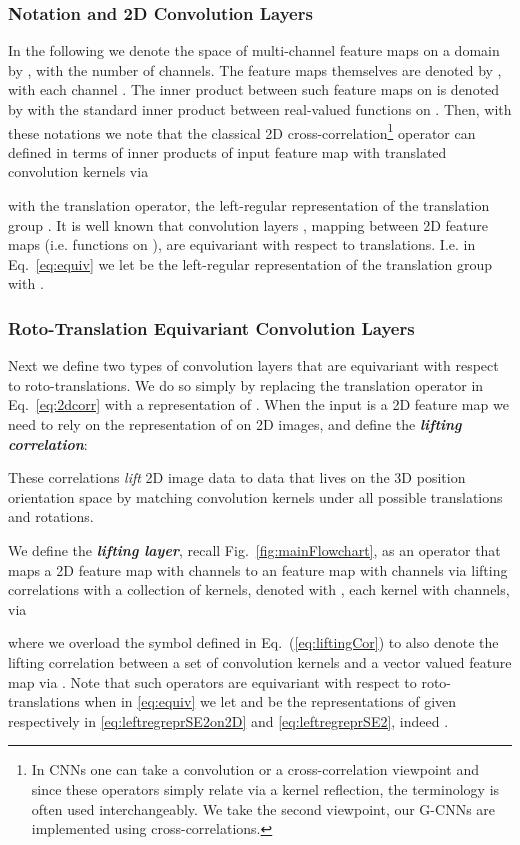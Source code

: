 \documentclass[twocolumn,final]{article}
\begin{document}
\subsubsection{Notation and 2D Convolution Layers}
In the following we denote the space of multi-channel feature maps on a domain  by , with  the number of channels. The feature maps themselves are denoted by , with each channel . The inner product between such feature maps on  is denoted by 
 with  the standard inner product between real-valued functions on .
Then, with these notations we note that the classical 2D cross-correlation\footnote{In CNNs one can take a convolution or a cross-correlation viewpoint and since these operators simply relate via a kernel reflection, the terminology is often used interchangeably. We take the second viewpoint, our G-CNNs are implemented using cross-correlations.} operator can defined in terms of inner products of input feature map  with translated convolution kernels  via

with  the translation operator, the left-regular representation of the translation group . It is well known that convolution layers , mapping between 2D feature maps (i.e. functions on ), are equivariant with respect to translations. I.e. in Eq.~\eqref{eq:equiv} we let  be the left-regular representation of the translation group with .

\subsubsection{Roto-Translation Equivariant Convolution Layers}
Next we define two types of convolution layers that are equivariant with respect to roto-translations. We do so simply by replacing the translation operator in Eq.~\eqref{eq:2dcorr} with a representation of . When the input is a 2D feature map  we need to rely on the representation  of  on 2D images, and define the \textbf{\emph{lifting correlation}}:

These correlations \emph{lift} 2D image data to data that lives on the 3D position orientation space  by matching convolution kernels under all possible translations and rotations. 

We define the \textbf{\emph{lifting layer}}, recall Fig.~\ref{fig:mainFlowchart}, as an operator {} that maps a 2D feature map  with  channels to an  feature map  with  channels via lifting correlations with a collection of  kernels, denoted with , each kernel with  channels, via

where we overload the  symbol defined in Eq.~(\ref{eq:liftingCor}) to also denote the lifting correlation between a set of convolution kernels and a vector valued feature map via . Note that such operators are equivariant with respect to roto-translations when in \eqref{eq:equiv} we let  and  be the representations of  given respectively in \eqref{eq:leftregreprSE2on2D} and \eqref{eq:leftregreprSE2}, indeed .
\end{document}
